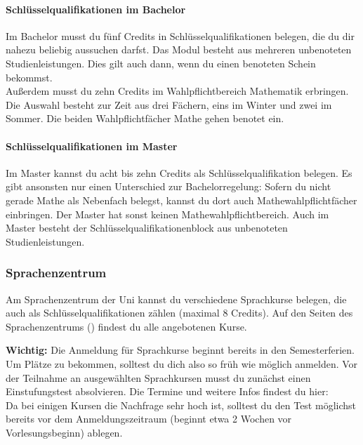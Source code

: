 	\paragraph*{Schlüsselqualifikationen im Bachelor}
	Im Bachelor musst du fünf Credits in Schlüsselqualifikationen belegen, die du dir nahezu beliebig aussuchen darfst. Das Modul besteht aus mehreren unbenoteten Studienleistungen. Dies gilt auch dann, wenn du einen benoteten Schein bekommst.\\
	Außerdem musst du zehn Credits im Wahlpflichtbereich Mathematik erbringen. Die Auswahl besteht zur Zeit aus drei Fächern, eins im Winter und zwei im Sommer. Die beiden Wahlpflichtfächer Mathe gehen benotet ein.

	\paragraph*{Schlüsselqualifikationen im Master}
	Im Master kannst du acht bis zehn Credits als Schlüsselqualifikation belegen. Es gibt ansonsten nur einen Unterschied zur Bachelorregelung: Sofern du nicht gerade Mathe als Nebenfach belegst, kannst du dort auch Mathewahlpflichtfächer einbringen. Der Master hat sonst keinen Mathewahlpflichtbereich. Auch im Master besteht der Schlüsselqualifikationenblock aus unbenoteten Studienleistungen.

	\subsubsection{Sprachenzentrum}
	Am Sprachenzentrum der Uni kannst du verschiedene Sprachkurse belegen, die auch als Schlüsselqualifikationen zählen (maximal 8 Credits). Auf den Seiten des Sprachenzentrums () findest du alle angebotenen Kurse.

	\textbf{Wichtig:} Die Anmeldung für Sprachkurse beginnt bereits in den Semesterferien. Um Plätze zu bekommen, solltest du dich also so früh wie möglich anmelden. Vor der Teilnahme an ausgewählten Sprachkursen musst du zunächst einen Einstufungstest absolvieren. Die Termine und weitere Infos findest du hier: \\
	Da bei einigen Kursen die Nachfrage sehr hoch ist, solltest du den Test möglichst bereits vor dem Anmeldungszeitraum (beginnt etwa 2 Wochen vor Vorlesungsbeginn) ablegen.

	\vspace{.5cm}

